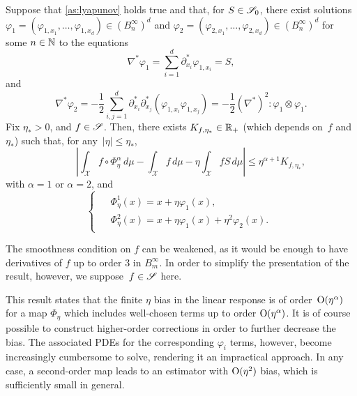 \begin{proposition}
\label{prop:gen_subtraction}
%
Suppose that \cref{as:lyapunov} holds true and that, for $S\in\S_0$, there exist solutions $\varphi_1 = (\varphi_{1,x_1},\dotsc,\varphi_{1,x_d}) \in (B^\infty_n)^d$ and $\varphi_2=(\varphi_{2,x_1},\dotsc,\varphi_{2,x_d}) \in (B^\infty_n)^d$ for some $n\in\N$ to the equations
%
\begin{equation}
	\nabla^*\varphi_1 = \sum_{i=1}^d \partial_{x_i}^* \varphi_{1,x_i} = S, %
	\label{eq:varphi1_PDE}
\end{equation}
%
and
%
\begin{equation}
	\nabla^*\varphi_2 = -\frac{1}{2}\sum_{i,j=1}^d \partial_{x_i}^*\partial_{x_j}^* (\varphi_{1,x_i}\varphi_{1,x_j}) = -\frac{1}{2}(\nabla^*)^2 \colon \varphi_1\otimes \varphi_1.
	\label{eq:varphi2_PDE}
\end{equation}
%
Fix $\eta_*>0$, and $f\in \S$. Then, there exists $K_{f,\eta_*} \in\R_+$ (which depends on~$f$ and~$\eta_*$) such that, for any~$|\eta| \leq \eta_*$,
%
\begin{equation}
	\qquad \left|\int_\mathcal{X} f\circ\Phi^\alpha_\eta \, d\mu - \int_\mathcal{X} f \, d\mu - \eta\int_\mathcal{X} f S \, d\mu\right| \leq \eta^{\alpha+1} K_{f,\eta_*},
	\label{eq:prop_eta_bias_bound}
\end{equation}
%
with $\alpha=1$ or $\alpha=2$, and
%
\begin{equation}
\begin{cases}
\begin{aligned}
	&\Phi_\eta^1(x) = x + \eta\varphi_1(x), \\
	&\Phi_\eta^2(x) = x + \eta\varphi_1(x) + \eta^2\varphi_2(x).
\end{aligned}
\end{cases}
\label{eq:Phi_alpha}
\end{equation}
%
\end{proposition}

\begin{remark}
The smoothness condition on $f$ can be weakened, as it would be enough to have derivatives of $f$ up to order 3 in $B^\infty_m$. In order to simplify the presentation of the result, however, we suppose~$f\in \S$ here.
\end{remark}

This result states that the finite $\eta$ bias in the linear response is of order~$\bigO(\eta^{\alpha})$ for a map $\Phi_\eta$ which includes well-chosen terms up to order $\bigO(\eta^\alpha)$. It is of course possible to construct higher-order corrections in order to further decrease the bias. The associated PDEs for the corresponding $\varphi_i$ terms, however, become increasingly cumbersome to solve, rendering it an impractical approach. In any case, a second-order map leads to an estimator with $\bigO(\eta^2)$ bias, which is sufficiently small in general.

